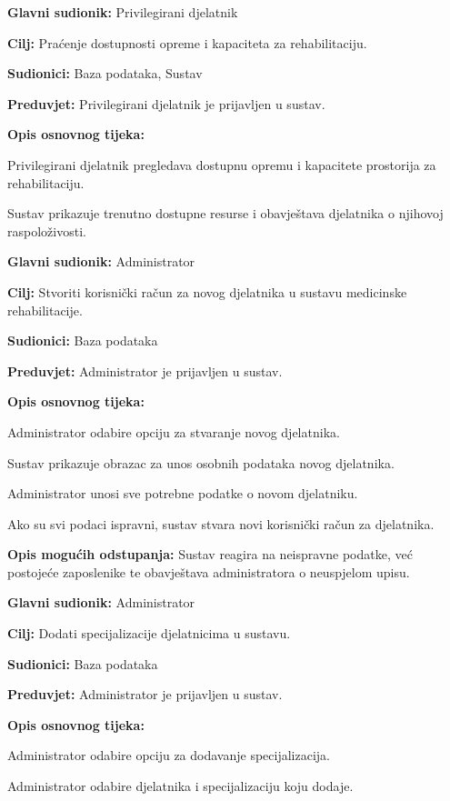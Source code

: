 	\item \textbf{Glavni sudionik:} Privilegirani djelatnik
	\item \textbf{Cilj:} Praćenje dostupnosti opreme i kapaciteta za rehabilitaciju.
	\item \textbf{Sudionici:} Baza podataka, Sustav
	\item \textbf{Preduvjet:} Privilegirani djelatnik je prijavljen u sustav.
	\item \textbf{Opis osnovnog tijeka:}
	\begin{packed_enum}
		\item Privilegirani djelatnik pregledava dostupnu opremu i kapacitete prostorija za rehabilitaciju.
		\item Sustav prikazuje trenutno dostupne resurse i obavještava djelatnika o njihovoj raspoloživosti.
	\end{packed_enum}
\closeusecase

	\item \textbf{Glavni sudionik:} Administrator
	\item \textbf{Cilj:} Stvoriti korisnički račun za novog djelatnika u sustavu medicinske rehabilitacije.
	\item \textbf{Sudionici:} Baza podataka
	\item \textbf{Preduvjet:} Administrator je prijavljen u sustav.
	\item \textbf{Opis osnovnog tijeka:}
	\begin{packed_enum}
		\item Administrator odabire opciju za stvaranje novog djelatnika.
		\item Sustav prikazuje obrazac za unos osobnih podataka novog djelatnika.
		\item Administrator unosi sve potrebne podatke o novom djelatniku.
		\item Ako su svi podaci ispravni, sustav stvara novi korisnički račun za djelatnika.
	\end{packed_enum}
	\item \textbf{Opis mogućih odstupanja:}
	Sustav reagira na neispravne podatke, već postojeće zaposlenike te obavještava administratora o neuspjelom upisu.
\closeusecase

	\item \textbf{Glavni sudionik:} Administrator
	\item \textbf{Cilj:} Dodati specijalizacije djelatnicima u sustavu.
	\item \textbf{Sudionici:} Baza podataka
	\item \textbf{Preduvjet:} Administrator je prijavljen u sustav.
	\item \textbf{Opis osnovnog tijeka:}
	\begin{packed_enum}
		\item Administrator odabire opciju za dodavanje specijalizacija.
		\item Administrator odabire djelatnika i specijalizaciju koju dodaje.
	\end{packed_enum}
\closeusecase

